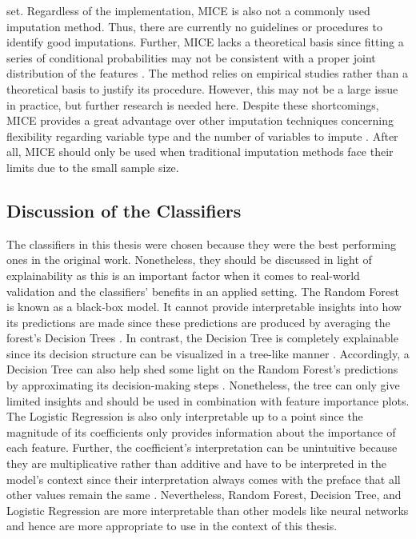 set.
Regardless of the implementation, MICE is also not a commonly used imputation 
method. Thus, there are currently no guidelines or procedures to identify 
good imputations. Further, MICE lacks a theoretical basis since fitting a 
series of conditional probabilities may not be consistent with a proper joint 
distribution of the features \cite{RN141}. The method relies on empirical 
studies rather than a 
theoretical basis to justify its procedure. However, this may not be a large 
issue in practice, but further research is needed here. Despite these 
shortcomings, MICE 
provides a great advantage over other imputation techniques concerning 
flexibility regarding variable type and the number of variables to impute 
\cite{RN141, RN142}. After all, MICE should only be used when traditional 
imputation methods face their limits due to the small sample size.
\subsection{Discussion of the Classifiers}
\label{sec:classifiers}
The classifiers in this thesis were chosen because they were the best performing 
ones in the original work. Nonetheless, they should be discussed in light of 
explainability as this is an important factor when it comes to real-world 
validation and the classifiers' benefits in an applied setting.
The Random Forest is known as a black-box model. It cannot provide 
interpretable insights into how its predictions are made since these 
predictions are produced by averaging the forest’s Decision Trees \cite{RN163}. 
In contrast, the Decision Tree is completely explainable since its decision 
structure can be visualized in a tree-like manner \cite{RN171}. Accordingly, a 
Decision Tree can also help shed some light on the Random Forest’s predictions 
by approximating its decision-making steps \cite{RN210}. Nonetheless, the tree 
can only give limited insights and should be used in combination with feature 
importance plots. The Logistic Regression is also only interpretable up to a 
point since the magnitude of its coefficients only provides information about 
the importance of each feature. Further, the coefficient's interpretation can be 
unintuitive because they are multiplicative rather than additive and have to be 
interpreted in the model's context since their interpretation always comes with 
the preface that all other values remain the same \cite{RN174}. Nevertheless, 
Random Forest, Decision Tree, and Logistic 
Regression are more interpretable than other models like neural networks and 
hence are more appropriate to use in the context of this thesis.
